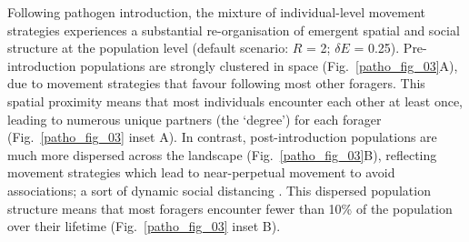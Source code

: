 Following pathogen introduction, the mixture of individual-level movement strategies experiences a substantial re-organisation of emergent spatial and social structure at the population level (default scenario: $R$ = 2; $\delta E$ = 0.25).
Pre-introduction populations are strongly clustered in space (Fig.~\ref{patho_fig_03}A), due to movement strategies that favour following most other foragers.
This spatial proximity means that most individuals encounter each other at least once, leading to numerous unique partners (the `degree') for each forager (Fig.~\ref{patho_fig_03} inset A).
In contrast, post-introduction populations are much more dispersed across the landscape (Fig.~\ref{patho_fig_03}B), reflecting movement strategies which lead to near-perpetual movement to avoid associations; a sort of dynamic social distancing \citep{pusceddu2021}.
This dispersed population structure means that most foragers encounter fewer than 10\% of the population over their lifetime (Fig.~\ref{patho_fig_03} inset B).

